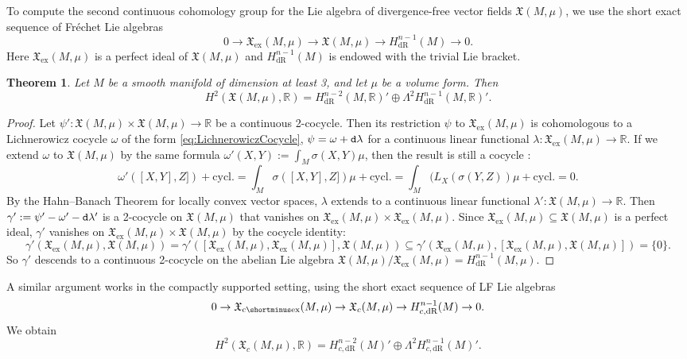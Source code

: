 \documentclass{article}
\newcommand{\ex}{\mathrm{ex}}
\newcommand{\dR}{\mathrm{dR}}
\newcommand{\fX}{\mathfrak{X}}
\newcommand{\R}{\mathbb{R}}
\newcommand{\dd}{{\tt d}}
\newcommand{\ceX}{\fX_{\mathrm{c}\shortminus\mathrm{ex}}}
\newtheorem{Theorem}{Theorem}[section]
\theoremstyle{definition}
\begin{document}
To compute the second continuous cohomology group for the Lie algebra of divergence-free vector fields $\fX(M,\mu)$, we use the %
short exact sequence of Fr\'echet Lie algebras
\begin{equation}\label{short}0 \rightarrow \fX_{\ex}(M,\mu) \rightarrow \fX(M,\mu) \rightarrow H^{n-1}_{\dR}(M) \rightarrow 0.\end{equation}
Here $ \fX_{\ex}(M,\mu)$ is a perfect ideal of $\fX(M,\mu)$ and $H^{n-1}_{\dR}(M)$ is endowed with the trivial Lie bracket. 
\begin{Theorem} Let $M$ be a smooth manifold of dimension at least 3, and let $\mu$ be a volume form. Then
\[H^2(\fX(M,\mu),\R) = H_{\dR}^{n-2}(M,\R)' \oplus \Lambda^2 H_{\dR}^{n-1}(M,\R)'.
\]
\end{Theorem}
\begin{proof}
Let $\psi' \colon \fX(M,\mu) \times \fX(M,\mu) \rightarrow \R$ be a continuous 2-cocycle. Then its restriction $\psi$ to  $\fX_{\ex}(M,\mu)$ 
is cohomologous to a Lichnerowicz cocycle $\omega$ of the form \eqref{eq:LichnerowiczCocycle}, $\psi = \omega + \dd \lambda$ for a continuous 
linear functional $\lambda \colon \fX_{\ex}(M,\mu) \rightarrow \R$. 
If we extend $\omega$ to $\fX(M,\mu)$ by the same formula $\omega'(X,Y) := \int_M\sigma(X,Y)\mu$, then the result is still a cocycle \cite{VizmanPapucHonour}:
\[\textstyle
\omega'([X,Y], Z]) + \mathrm{cycl.} = \int_{M}\sigma([X,Y], Z])\mu + \mathrm{cycl.} = \int_{M}(L_{X}(\sigma(Y,Z)) \mu + \mathrm{cycl.} =0.
\]
By the Hahn--Banach Theorem for locally convex vector spaces, $\lambda$ extends to a continuous linear functional $\lambda' \colon \fX(M,\mu) \rightarrow \R$. 
Then $\gamma' := \psi' - \omega' - \dd\lambda'$ is a 2-cocycle on $\fX(M,\mu)$ that vanishes on $\fX_{\ex}(M,\mu) \times \fX_{\ex}(M,\mu)$.
Since $\fX_{\ex}(M,\mu) \subseteq \fX(M,\mu)$ is a perfect ideal, $\gamma'$ vanishes on $\fX_{\ex}(M,\mu) \times \fX(M,\mu)$
by the cocycle identity:
\[\gamma'(\fX_{\ex}(M,\mu), \fX(M,\mu)) = \gamma'([\fX_{\ex}(M,\mu), \fX_{\ex}(M,\mu)], \fX(M,\mu)) \subseteq 
\gamma'(\fX_{\ex}(M,\mu), [\fX_{\ex}(M,\mu), \fX(M,\mu)]) = \{0\}.
\]
So $\gamma'$ descends to a continuous 2-cocycle on the abelian Lie algebra $\fX(M,\mu)/\fX_{\ex}(M,\mu) = H^{n-1}_{\dR}(M,\mu)$. 
\end{proof}




A similar argument works in the compactly supported setting, using the short exact sequence of LF Lie algebras
\begin{equation}
0 \rightarrow \ceX(M,\mu) \rightarrow \fX_c(M,\mu) \rightarrow H^{n-1}_{c,\dR}(M) \rightarrow 0.
\end{equation}
We obtain
\begin{equation}
H^2(\fX_c(M,\mu) ,\R)
=H_{c,\dR}^{n-2}(M)'\oplus\Lambda^2H_{c,\dR}^{n-1}(M)'. 
\end{equation}
\end{document}
